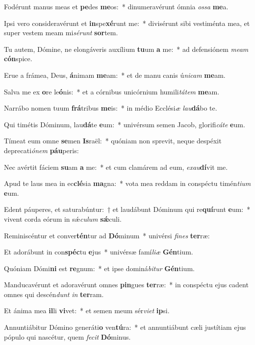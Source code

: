 \item Fodérunt manus meas et \textbf{pe}des \textbf{me}os:~* dinumeravérunt ómnia \textit{os}\textit{sa} \textbf{me}a.
\item Ipsi vero consideravérunt et \textbf{in}spe\textbf{xé}runt me:~* divisérunt sibi vestiménta mea, et super vestem meam mi\textit{sé}\textit{runt} \textbf{sor}tem.
\item Tu autem, Dómine, ne elongáveris auxílium \textbf{tu}um \textbf{a} me:~* ad defensiónem \textit{me}\textit{am} \textbf{cón}spice.
\item Erue a frámea, Deus, \textbf{á}nimam \textbf{me}am:~* et de manu canis ú\textit{ni}\textit{cam} \textbf{me}am.
\item Salva me ex \textbf{o}re le\textbf{ó}nis:~* et a córnibus unicórnium humili\textit{tá}\textit{tem} \textbf{me}am.
\item Narrábo nomen tuum \textbf{frá}tribus \textbf{me}is:~* in médio Ecclési\textit{æ} \textit{lau}\textbf{dá}bo te.
\item Qui timétis Dóminum, lau\textbf{dá}te \textbf{e}um:~* univérsum semen Jacob, glorifi\textit{cá}\textit{te} \textbf{e}um.
\item Tímeat eum omne \textbf{se}men \textbf{Is}raël:~* quóniam non sprevit, neque despéxit deprecati\textit{ó}\textit{nem} \textbf{páu}peris:
\item Nec avértit fáciem \textbf{su}am \textbf{a} me:~* et cum clamárem ad eum, \textit{ex}\textit{au}\textbf{dí}vit me.
\item Apud te laus mea in ec\textbf{clé}sia \textbf{ma}gna:~* vota mea reddam in conspéctu timén\textit{ti}\textit{um} \textbf{e}um.
\item Edent páuperes, et saturabúntur:~† et laudábunt Dóminum qui re\textbf{quí}runt \textbf{e}um:~* vivent corda eórum in sǽ\textit{cu}\textit{lum} \textbf{sǽ}culi.
\item Reminiscéntur et conver\textbf{tén}tur ad \textbf{Dó}minum~* univérsi \textit{fi}\textit{nes} \textbf{ter}ræ:
\item Et adorábunt in con\textbf{spéc}tu \textbf{e}jus~* univérsæ famí\textit{li}\textit{æ} \textbf{Gén}tium.
\item Quóniam Dómi\textbf{ni} est \textbf{re}gnum:~* et ipse dominá\textit{bi}\textit{tur} \textbf{Gén}tium.
\item Manducavérunt et adoravérunt omnes \textbf{pin}gues \textbf{ter}ræ:~* in conspéctu ejus cadent omnes qui descén\textit{dunt} \textit{in} \textbf{ter}ram.
\item Et ánima mea \textbf{il}li \textbf{vi}vet:~* et semen meum sér\textit{vi}\textit{et} \textbf{ip}si.
\item Annuntiábitur Dómino generáti\textbf{o} ven\textbf{tú}ra:~* et annuntiábunt cæli justítiam ejus pópulo qui nascétur, quem \textit{fe}\textit{cit} \textbf{Dó}minus.
